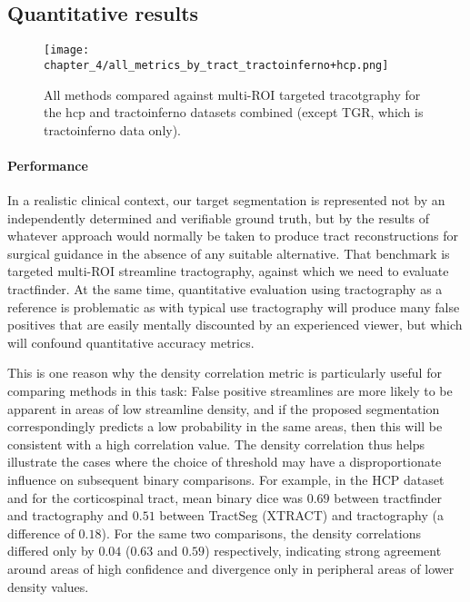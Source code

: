 \subsection{Quantitative results}\label{sec:quant}

\begin{figure}[h!]
  \centering
  \texttt{[image: chapter\_4/all\_metrics\_by\_tract\_tractoinferno+hcp.png]}
  \caption{All methods compared against multi-ROI targeted tracotgraphy for the hcp and tractoinferno datasets combined (except TGR, which is tractoinferno data only). }
  \label{fig:combobox}
\end{figure}

\paragraph*{Performance}

In a realistic clinical context, our target segmentation is represented not by an independently determined and verifiable ground truth, but by the results of whatever approach would normally be taken to produce tract reconstructions for surgical guidance in the absence of any suitable alternative.
That benchmark is targeted multi-ROI streamline tractography, against which we need to evaluate tractfinder.
At the same time, quantitative evaluation using tractography as a reference is problematic as with typical use tractography will produce many false positives that are easily mentally discounted by an experienced viewer, but which will confound quantitative accuracy metrics.


This is one reason why the density correlation metric is particularly useful for comparing methods in this task:
False positive streamlines are more likely to be apparent in areas of low streamline density, and if the proposed segmentation correspondingly predicts a low probability in the same areas, then this will be consistent with a high correlation value.
The density correlation thus helps illustrate the cases where the choice of threshold may have a disproportionate influence on subsequent binary comparisons.
For example, in the HCP dataset and for the corticospinal tract, mean binary \gls{dice} was $0.69$ between tractfinder and tractography and $0.51$ between TractSeg (XTRACT) and tractography (a difference of $0.18$).
For the same two comparisons, the density correlations differed only by $0.04$ ($0.63$ and $0.59$) respectively, indicating strong agreement around areas of high confidence and divergence only in peripheral areas of lower density values.


